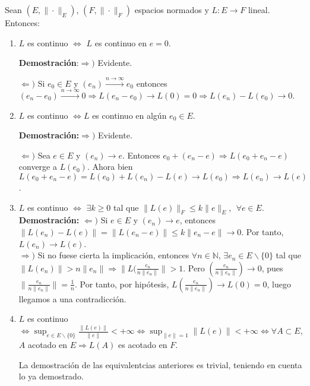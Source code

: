 \documentclass{article}
\begin{document}
Sean $(E,\|\cdot\|_E)$, $(F,\|\cdot\|_F)$ espacios normados y $L:E\rightarrow F$ lineal. Entonces:
\begin{enumerate}
\item $L$ es continuo $\Leftrightarrow$ $L$ es continuo en $e=0$.

\textbf{Demostración}:$\Rightarrow)$ Evidente.

$\Leftarrow)$ Si $e_0\in E$ y $(e_n)\xrightarrow{n\to\infty}e_0$ entonces $(e_n-e_0)\xrightarrow{n\to\infty}0\Rightarrow L(e_n-e_0)\rightarrow L(0)=0\Rightarrow L(e_n)-L(e_0)\rightarrow 0$.\\

\item $L$ es continuo $\Leftrightarrow L$ es continuo en algún $e_0\in E$.

\textbf{Demostración:}$\Rightarrow)$ Evidente.

$\Leftarrow)$ Sea $e\in E$ y $(e_n)\rightarrow e$. Entonces $e_0+(e_n-e)\Rightarrow L(e_0+e_n-e)$ converge a $L(e_0)$. Ahora bien $L(e_0+e_n-e)=L(e_0)+L(e_n)-L(e)\rightarrow L(e_0)\Rightarrow L(e_n)\rightarrow L(e)$.

\item $L$ es continuo $\Leftrightarrow$ $\exists k\geq 0$ tal que $\|L(e)\|_F\leq k\|e\|_E,\:\:\forall e\in E$.\\

\textbf{Demostración:} $\Leftarrow)$ Si $e\in E$ y $(e_n)\rightarrow e$, entonces $\|L(e_n)-L(e)\|=\|L(e_n-e)\|\leq k\|e_n-e\|\rightarrow 0$. Por tanto, $L(e_n)\rightarrow L(e)$.\\

$\Rightarrow)$ Si no fuese cierta la implicación, entonces $\forall n\in \mathbb{N}$, $\exists e_n\in E\backslash\{0\}$ tal que $\|L(e_n)\|>n\|e_n\|\Rightarrow \|L(\frac{e_n}{n\|e_n\|}\|>1$. Pero $(\frac{e_n}{n\|e_n\|})\rightarrow 0$, pues $\|\frac{e_n}{n\|e_n\|}\|=\frac{1}{n}$. Por tanto, por hipótesis, $L(\frac{e_n}{n\|e_n\|})\rightarrow L(0)=0$, luego llegamos a una contradicción.

\item $L$ es continuo $\Leftrightarrow \sup_{e\in E\backslash\{0\}}\frac{\|L(e)\|}{\|e\|}<+\infty\Leftrightarrow \sup_{\|e\|=1}\|L(e)\|<+\infty\Leftrightarrow \forall A\subset E$, $A$ acotado en $E\Rightarrow L(A)$ es acotado en $F$.

La demostración de las equivalentcias anteriores es trivial, teniendo en cuenta lo ya demostrado.
\end{enumerate}
\end{document}
